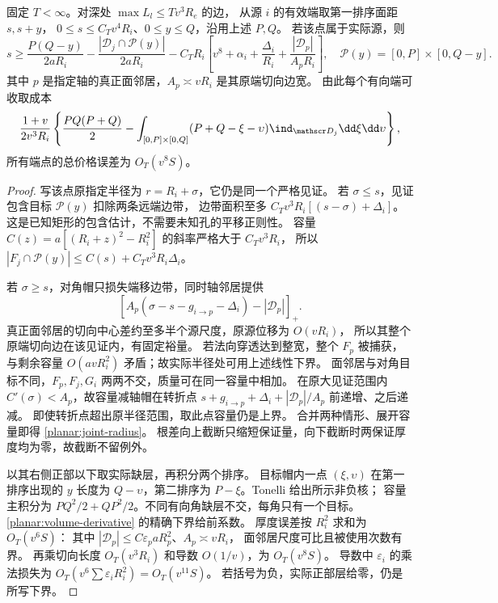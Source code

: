 \begin{lemma}[实际轴帽约束]\label{planar:axis-cap}
固定 \(T<\infty\)。对深处 \(\max L_l\le Tv^3R_e\) 的边，
从源 \(i\) 的有效端取第一排序面距 \(s,s+y\)，
\(0\le s\le C_Tv^4R_i\)、\(0\le y\le Q\)，沿用上述 \(P,Q\)。
若该点属于实际源，则
\begin{equation}\label{planar:joint-radius}
 s\ge\frac{P(Q-y)}{2aR_i}
 -\frac{|\mathscr D_j\cap\mathcal P(y)|}{2aR_i}
 -C_TR_i\left[v^8+\alpha_i+\frac{\Delta_i}{R_i}
              +\frac{|\mathscr D_p|}{A_pR_i}\right],
 \quad\mathcal P(y)=[0,P]\times[0,Q-y].
\end{equation}
其中 \(p\) 是指定轴的真正面邻居，\(A_p\asymp vR_i\) 是其原端切向边宽。
由此每个有向端可收取成本
\begin{equation}\label{planar:feedback-kernel}
 \frac{1+v}{2v^3R_i}\left\{
 \frac{PQ(P+Q)}2-
 \int_{[0,P]\times[0,Q]}(P+Q-\xi-\upsilon)
                  \ind_{\mathscr D_j}\dd\xi\dd\upsilon\right\},
\end{equation}
所有端点的总价格误差为 \(O_T(v^8S)\)。
\end{lemma}
\begin{proof}
写该点原指定半径为 \(r=R_i+\sigma\)，它仍是同一个严格见证。
若 \(\sigma\le s\)，见证包含目标 \(\mathcal P(y)\) 扣除两条远端边带，
边带面积至多 \(C_Tv^3R_i[(s-\sigma)+\Delta_i]\)。
这是已知矩形的包含估计，不需要未知孔的平移正则性。
容量 \(C(z)=a[(R_i+z)^2-R_i^2]\) 的斜率严格大于 \(C_Tv^3R_i\)，
所以 \(|F_j\cap\mathcal P(y)|\le C(s)+C_Tv^3R_i\Delta_i\)。

若 \(\sigma\ge s\)，对角帽只损失端移边带，同时轴邻居提供
\[
 [A_p(\sigma-s-g_{i\to p}-\Delta_i)-|\mathscr D_p|]_+.
\]
真正面邻居的切向中心差约至多半个源尺度，原源位移为 \(O(vR_i)\)，
所以其整个原端切向边在该见证内，有固定裕量。
若法向穿透达到整宽，整个 \(F_p\) 被捕获，
与剩余容量 \(O(avR_i^2)\) 矛盾；故实际半径处可用上述线性下界。
面邻居与对角目标不同，\(F_p,F_j,G_i\) 两两不交，质量可在同一容量中相加。
在原大见证范围内 \(C'(\sigma)<A_p\)，故容量减轴帽在转折点
\(s+g_{i\to p}+\Delta_i+|\mathscr D_p|/A_p\) 前递增、之后递减。
即使转折点超出原半径范围，取此点容量仍是上界。
合并两种情形、展开容量即得 \eqref{planar:joint-radius}。
根差向上截断只缩短保证量，向下截断时两保证厚度均为零，故截断不留例外。

以其右侧正部以下取实际缺层，再积分两个排序。
目标帽内一点 \((\xi,\upsilon)\) 在第一排序出现的 \(y\) 长度为
\(Q-\upsilon\)，第二排序为 \(P-\xi\)。Tonelli 给出所示非负核；
容量主积分为 \(PQ^2/2+QP^2/2\)。不同有向角缺层不交，每角只有一个目标。
\eqref{planar:volume-derivative} 的精确下界给前系数。
厚度误差按 \(R_i^2\) 求和为 \(O_T(v^6S)\)：
其中 \(|\mathscr D_p|\le C\varepsilon_paR_p^2\)、\(A_p\asymp vR_i\)，
面邻居尺度可比且被使用次数有界。
再乘切向长度 \(O_T(v^3R_i)\) 和导数 \(O(1/v)\)，为 \(O_T(v^8S)\)。
导数中 \(\varepsilon_i\) 的乘法损失为
\(O_T(v^6\sum\varepsilon_iR_i^2)=O_T(v^{11}S)\)。
若括号为负，实际正部层给零，仍是所写下界。
\end{proof}

